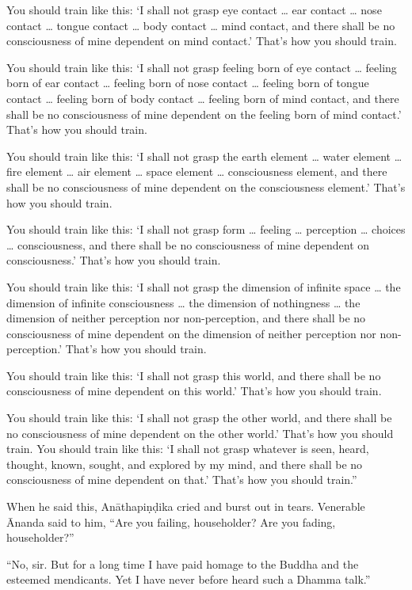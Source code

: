 \documentclass[12pt,openany]{book}%
\begin{document}
You should train like this: ‘I shall not grasp eye contact … ear contact … nose contact … tongue contact … body contact … mind contact, and there shall be no consciousness of mine dependent on mind contact.’ That’s how you should train. 

You should train like this: ‘I shall not grasp feeling born of eye contact … feeling born of ear contact … feeling born of nose contact … feeling born of tongue contact … feeling born of body contact … feeling born of mind contact, and there shall be no consciousness of mine dependent on the feeling born of mind contact.’ That’s how you should train. 

You should train like this: ‘I shall not grasp the earth element … water element … fire element … air element … space element … consciousness element, and there shall be no consciousness of mine dependent on the consciousness element.’ That’s how you should train. 

You should train like this: ‘I shall not grasp form … feeling … perception … choices … consciousness, and there shall be no consciousness of mine dependent on consciousness.’ That’s how you should train. 

You should train like this: ‘I shall not grasp the dimension of infinite space … the dimension of infinite consciousness … the dimension of nothingness … the dimension of neither perception nor non-perception, and there shall be no consciousness of mine dependent on the dimension of neither perception nor non-perception.’ That’s how you should train. 

You should train like this: ‘I shall not grasp this world, and there shall be no consciousness of mine dependent on this world.’ That’s how you should train. 

You should train like this: ‘I shall not grasp the other world, and there shall be no consciousness of mine dependent on the other world.’ That’s how you should train. You should train like this: ‘I shall not grasp whatever is seen, heard, thought, known, sought, and explored by my mind, and there shall be no consciousness of mine dependent on that.’ That’s how you should train.” 

When he said this, \textsanskrit{Anāthapiṇḍika} cried and burst out in tears. Venerable Ānanda said to him, “Are you failing, householder? Are you fading, householder?” 

“No, sir. But for a long time I have paid homage to the Buddha and the esteemed mendicants. Yet I have never before heard such a Dhamma talk.” 
\end{document}
